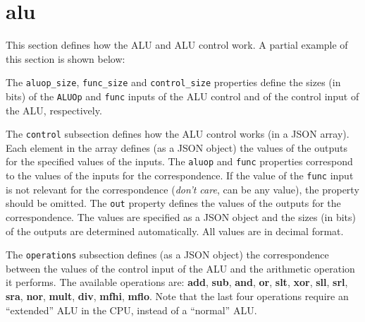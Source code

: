 \documentclass[11pt,a4paper,twoside,titlepage]{report}
\begin{document}
\section{alu}

This section defines how the ALU and ALU control work.
A partial example of this section is shown below:



The \verb+aluop_size+, \verb+func_size+ and \verb+control_size+ properties
define the sizes (in bits) of the \verb+ALUOp+ and \verb+func+ inputs of the
ALU control and of the control input of the ALU, respectively.

The \verb+control+ subsection defines how the ALU control works (in a JSON array).
Each element in the array defines (as a JSON object) the values of the outputs
for the specified values of the inputs.
The \verb+aluop+ and \verb+func+ properties correspond to the values of the
inputs for the correspondence. If the value of the \verb+func+ input is not relevant
for the correspondence (\emph{don't care}, can be any value), the property 
should be omitted.
The \verb+out+ property defines the values of the outputs for the correspondence.
The values are specified as a JSON object and the sizes (in bits) of the outputs
are determined automatically.
All values are in decimal format.

The \verb+operations+ subsection defines (as a JSON object) the correspondence 
between the values of the control input of the ALU and the arithmetic operation 
it performs.
The available operations are: \textbf{add}, \textbf{sub}, \textbf{and}, \textbf{or},
\textbf{slt}, \textbf{xor}, \textbf{sll}, \textbf{srl}, \textbf{sra}, \textbf{nor},
\textbf{mult}, \textbf{div}, \textbf{mfhi}, \textbf{mflo}.
Note that the last four operations require an ``extended'' ALU in the CPU, instead 
of a ``normal'' ALU.
\end{document}
